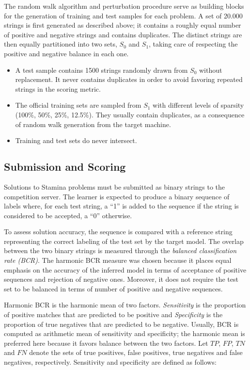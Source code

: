 The random walk algorithm and perturbation procedure serve as building blocks for the generation of training and test samples for each problem. A set of 20.000 strings is first generated as described above; it contains a roughly equal number of positive and negative strings and contains duplicates. The distinct strings are then equally partitioned into two sets, $S_0$ and $S_1$, taking care of respecting the positive and negative balance in each one.
\begin{itemize}
\item A test sample contains 1500 strings randomly drawn from $S_0$ without replacement. It never contains duplicates in order to avoid favoring repeated strings in the scoring metric.
\item The official training sets are sampled from $S_1$ with different levels of sparsity (100\%, 50\%, 25\%, 12.5\%). They usually contain duplicates, as a consequence of random walk generation from the target machine. 
\item Training and test sets do never intersect.
\end{itemize}

\subsection{Submission and Scoring\label{subsection:stamina-scoring}}

Solutions to Stamina problems must be submitted as binary strings to the competition server. The learner is expected to produce a binary sequence of labels where, for each test string, a ``1'' is added to the sequence if the string is considered to be accepted, a ``0'' otherwise. 

To assess solution accuracy, the sequence is compared with a reference string representing the correct labeling of the test set by the target model. The overlap between the two binary strings is measured through the \emph{balanced classification rate (BCR)}. The harmonic BCR measure was chosen because it places equal emphasis on the accuracy of the inferred model in terms of acceptance of positive sequences and rejection of negative ones. Moreover, it does not require the test set to be balanced in terms of number of positive and negative sequences. 

Harmonic BCR is the harmonic mean of two factors. \emph{Sensitivity} is the proportion of positive matches that are predicted to be positive and \emph{Specificity} is the proportion of true negatives that are predicted to be negative. Usually, BCR is computed as arithmetic mean of sensitivity and specificity; the harmonic mean is preferred here because it favors balance between the two factors. Let $TP$, $FP$, $TN$ and $FN$ denote the sets of true positives, false positives, true negatives and false negatives, respectively. Sensitivity and specificity are defined as follows:


